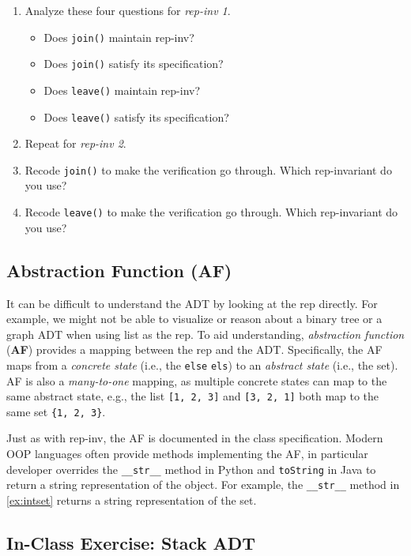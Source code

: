 \documentclass[oneside,11pt,dvipsnames]{book}
\newcommand{\code}[1]{\texttt{#1}}
\begin{document}
\begin{enumerate}
\item Analyze these four questions for \emph{rep-inv 1}.
\begin{itemize}
    \item Does \code{join()} maintain rep-inv?
    \item Does \code{join()} satisfy its specification?
    \item Does \code{leave()} maintain rep-inv?
    \item Does \code{leave()} satisfy its specification?
\end{itemize}
\item Repeat for \emph{rep-inv 2}.
\item Recode \code{join()} to make the verification go through. Which rep-invariant do you use?
\item Recode \code{leave()} to make the verification go through. Which rep-invariant do you use?
\end{enumerate}

\subsection{Abstraction Function (AF)} 

It can be difficult to understand the ADT by looking at the rep directly. For example, we might not be able to visualize or reason about a binary tree or a graph ADT when using list as the rep. To aid understanding, \emph{abstraction function} (\textbf{AF}) provides a mapping between the rep and the ADT. 
Specifically, the AF maps from a \emph{concrete state} (i.e., the \code{else} \code{els}) to an \emph{abstract state} (i.e., the set). AF is also a \emph{many-to-one} mapping, as multiple concrete states can map to the same abstract state, e.g., the list \code{[1, 2, 3]} and \code{[3, 2, 1]} both map to the same set \code{\{1, 2, 3\}}. 

Just as with rep-inv, the AF is documented in the class specification. Modern OOP languages often provide methods implementing the AF, in particular developer overrides the \code{\_\_str\_\_} method in Python and \code{toString} in Java to return a string representation of the object. For example, the \code{\_\_str\_\_} method in \autoref{ex:intset} returns a string representation of the set.



\subsection{In-Class Exercise: Stack ADT}
\end{document}
